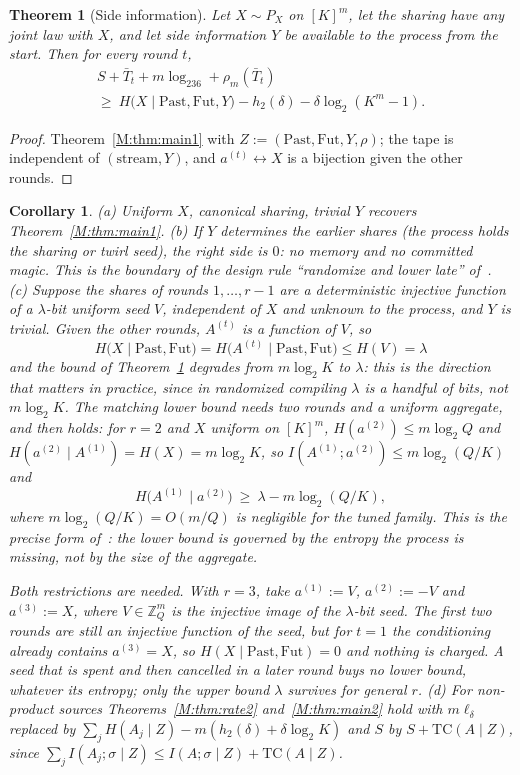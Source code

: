 \documentclass[aps,prx,twocolumn,superscriptaddress,nofootinbib,longbibliography]{revtex4-2}
\theoremstyle{plain}
\newtheorem{theorem}{Theorem}
\newtheorem{corollary}{Corollary}
\theoremstyle{definition}
\theoremstyle{remark}
\newcommand{\Z}{\mathbb{Z}}
\begin{document}
\begin{theorem}[Side information]\label{thm:side}
Let $X\sim P_X$ on $[K]^m$, let the sharing have any joint law with $X$, and let side information $Y$ be available to the process from the start. Then for every round $t$,
\begin{multline}
S+\bar T_t+m\log_236+\rho_m(\bar T_t)\\
\ge\ H\big(X\mid\mathrm{Past},\mathrm{Fut},Y\big)-h_2(\delta)-\delta\log_2(K^m-1).
\end{multline}
\end{theorem}
\begin{proof}
Theorem~\ref{M:thm:main1} with $Z:=(\mathrm{Past},\mathrm{Fut},Y,\rho)$; the tape is independent of $(\text{stream},Y)$, and $a^{(t)}\leftrightarrow X$ is a bijection given the other rounds.
\end{proof}
\begin{corollary}\label{cor:side}
(a) Uniform $X$, canonical sharing, trivial $Y$ recovers Theorem~\ref{M:thm:main1}.
(b) If $Y$ determines the earlier shares (the process holds the sharing or twirl seed), the right side is $0$: no memory and no committed magic. This is the boundary of the design rule ``randomize and lower late'' of~\cite{Paper1}.
(c) Suppose the shares of rounds $1,\dots,r-1$ are a deterministic injective function of a $\lambda$-bit uniform seed $V$, independent of $X$ and unknown to the process, and $Y$ is trivial. Given the other rounds, $A^{(t)}$ is a function of $V$, so
\[H\big(X\mid\mathrm{Past},\mathrm{Fut}\big)=H\big(A^{(t)}\mid\mathrm{Past},\mathrm{Fut}\big)\le H(V)=\lambda\]
and the bound of Theorem~\ref{thm:side} degrades from $m\log_2K$ to $\lambda$: this is the direction that matters in practice, since in randomized compiling $\lambda$ is a handful of bits, not $m\log_2K$. The matching lower bound needs two rounds and a uniform aggregate, and then holds: for $r=2$ and $X$ uniform on $[K]^m$, $H(a^{(2)})\le m\log_2Q$ and $H(a^{(2)}\mid A^{(1)})=H(X)=m\log_2K$, so $I(A^{(1)};a^{(2)})\le m\log_2(Q/K)$ and
\[H\big(A^{(1)}\mid a^{(2)}\big)\ \ge\ \lambda-m\log_2(Q/K),\]
where $m\log_2(Q/K)=O(m/Q)$ is negligible for the tuned family. This is the precise form of~\cite[Rem.~9]{Paper1}: the lower bound is governed by the entropy the process is missing, not by the size of the aggregate.

Both restrictions are needed. With $r=3$, take $a^{(1)}:=V$, $a^{(2)}:=-V$ and $a^{(3)}:=X$, where $V\in\Z_Q^m$ is the injective image of the $\lambda$-bit seed. The first two rounds are still an injective function of the seed, but for $t=1$ the conditioning already contains $a^{(3)}=X$, so $H(X\mid\mathrm{Past},\mathrm{Fut})=0$ and nothing is charged. A seed that is spent and then cancelled in a later round buys no lower bound, whatever its entropy; only the upper bound $\lambda$ survives for general $r$.
(d) For non-product sources Theorems~\ref{M:thm:rate2} and~\ref{M:thm:main2} hold with $m\ell_\delta$ replaced by $\sum_jH(A_j\mid Z)-m(h_2(\delta)+\delta\log_2K)$ and $S$ by $S+\mathrm{TC}(A\mid Z)$, since $\sum_jI(A_j;\sigma\mid Z)\le I(A;\sigma\mid Z)+\mathrm{TC}(A\mid Z)$.
\end{corollary}
\end{document}
